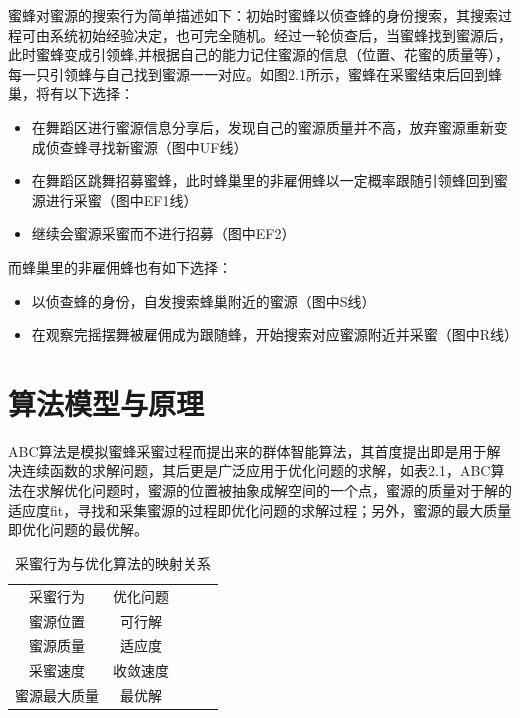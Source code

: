 \documentclass[a4paper,12pt]{report}
\begin{document}
\begin{spacing}{1.5}
		蜜蜂对蜜源的搜索行为简单描述如下：初始时蜜蜂以侦查蜂的身份搜索，其搜索过程可由系统初始经验决定，也可完全随机。经过一轮侦查后，当蜜蜂找到蜜源后，此时蜜蜂变成引领蜂,并根据自己的能力记住蜜源的信息（位置、花蜜的质量等），每一只引领蜂与自己找到蜜源一一对应。如图2.1所示，蜜蜂在采蜜结束后回到蜂巢，将有以下选择：
			\begin{itemize}
				\item {在舞蹈区进行蜜源信息分享后，发现自己的蜜源质量并不高，放弃蜜源重新变成侦查蜂寻找新蜜源（图中UF线）}
				\item {在舞蹈区跳舞招募蜜蜂，此时蜂巢里的非雇佣蜂以一定概率跟随引领蜂回到蜜源进行采蜜（图中EF1线）}
				\item {继续会蜜源采蜜而不进行招募（图中EF2）}
			\end{itemize}
		而蜂巢里的非雇佣蜂也有如下选择：
			\begin{itemize}
				\item {以侦查蜂的身份，自发搜索蜂巢附近的蜜源（图中S线）}
				\item {在观察完摇摆舞被雇佣成为跟随蜂，开始搜索对应蜜源附近并采蜜（图中R线）}
			\end{itemize}

\section{算法模型与原理}
	ABC算法是模拟蜜蜂采蜜过程而提出来的群体智能算法，其首度提出即是用于解决连续函数的求解问题，其后更是广泛应用于优化问题的求解，如表2.1，ABC算法在求解优化问题时，蜜源的位置被抽象成解空间的一个点，蜜源的质量对于解的适应度fit，寻找和采集蜜源的过程即优化问题的求解过程；另外，蜜源的最大质量即优化问题的最优解。

	\begin{table}[!htbp]
		\centering
		\caption{采蜜行为与优化算法的映射关系}
		\label{my-label}
		\begin{tabular}{|c|c|ccc}
		\cline{1-2}
		采蜜行为    	& 优化问题 	&  &  &  \\ \cline{1-2}
		蜜源位置		& 可行解   	&  &  &  \\ \cline{1-2}
		蜜源质量 		& 适应度 	&  &  &  \\ \cline{1-2}	
		采蜜速度 		& 收敛速度  &  &  &  \\ \cline{1-2}
		蜜源最大质量 	& 最优解 	&  &  &  \\ \cline{1-2}
		\end{tabular}
	\end{table}


\end{spacing}
\end{document}
